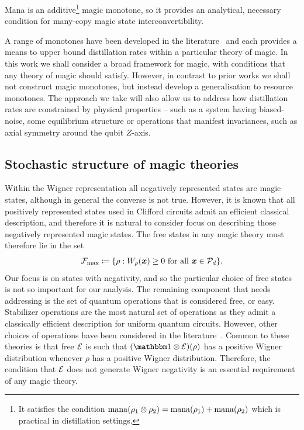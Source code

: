 \documentclass[pra,
aps,
twocolumn,
superscriptaddress,
groupedaddress,
nofootinbib,
reprint
]{revtex4-1}
\begin{document}
Mana is an additive\footnote{It satisfies the condition ${{\rm{mana}}(\rho_1 \otimes \rho_2)} = {{\rm{mana}}(\rho_1)} + {{\rm{mana}}(\rho_2)}$ which is practical in distillation settings.} magic monotone, so it provides an analytical, necessary condition for many-copy magic state interconvertibility.

A range of monotones have been developed in the literature~\cite{cit:howard, Wang_2020, Seddon_2021} and each provides a means to upper bound distillation rates within a particular theory of magic. In this work we shall consider a broad framework for magic, with conditions that any theory of magic should satisfy. However, in contrast to prior works we shall not construct magic monotones, but instead develop a generalisation to resource monotones. The approach we take will also allow us to address how distillation rates are constrained by physical properties -- such as a system having biased-noise, some equilibrium structure or operations that manifest invariances, such as axial symmetry around the qubit $Z$-axis.




\subsection{Stochastic structure of magic theories}
\label{sec:struc}

Within the Wigner representation all negatively represented states are magic states, although in general the converse is not true. However, it is known that all positively represented states used in Clifford circuits admit an efficient classical description, and therefore it is natural to consider focus on describing those negatively represented magic states. The free states in any magic theory must therefore lie in the set
\begin{equation}
    \Fmax \coloneqq \{ \rho: \W[\bmx]{\rho} \geq 0 \text{ for all } \bmx \in \cal{P}_d\}.
\end{equation}
Our focus is on states with negativity, and so the particular choice of free states is not so important for our analysis. The remaining component that needs addressing is the set of quantum operations that is considered free, or easy. Stabilizer operations are the most natural set of operations as they admit a classically efficient description for uniform quantum circuits. However, other choices of operations have been considered in the literature~\cite{cit:ahmadi, cit:seddon, Wang_2019}. Common to these theories is that free $\mathcal{E}$  is such that $(\id \otimes \E) (\rho)$ has a positive Wigner distribution whenever $ \rho$ has a positive Wigner distribution.  Therefore, the condition that $\mathcal{E}$ does not generate Wigner negativity is an essential requirement of any magic theory.
\end{document}
